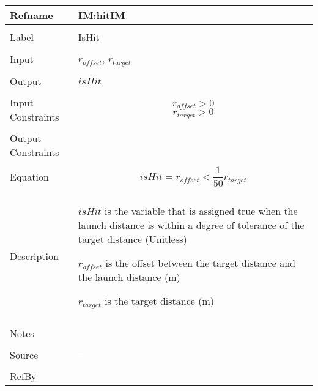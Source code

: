 \documentclass[12pt]{article}
\begin{document}
\noindent \begin{minipage}{\textwidth}
\begin{tabular}{p{} p{}}
\toprule \textbf{Refname} & \textbf{IM:hitIM}
\label{IM:hitIM}
\\ \midrule \\
Label & IsHit
\\ \midrule \\
Input & ${r_{offset}}$, ${r_{target}}$
\\ \midrule \\
Output & $isHit$
\\ \midrule \\
Input Constraints & \begin{displaymath}
                    {r_{offset}}>0
                    \end{displaymath}
                    \begin{displaymath}
                    {r_{target}}>0
                    \end{displaymath}
\\ \midrule \\
Output Constraints & 
\\ \midrule \\
Equation & \begin{displaymath}
           isHit={r_{offset}}<\frac{1}{50} {r_{target}}
           \end{displaymath}
\\ \midrule \\
Description & \begin{symbDescription}
              \item{$isHit$ is the variable that is assigned true when the launch distance is within a degree of tolerance of the target distance (Unitless)}
              \item{${r_{offset}}$ is the offset between the target distance and the launch distance (m)}
              \item{${r_{target}}$ is the target distance (m)}
              \end{symbDescription}
\\ \midrule \\
Notes & 
\\ \midrule \\
Source & --
\\ \midrule \\
RefBy & 
\\ \bottomrule \end{tabular}
\end{minipage}
\end{document}
